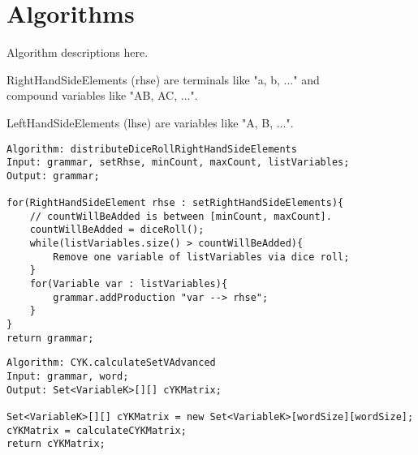 
\section{Algorithms}\label{algorithms}
Algorithm descriptions here.

\noindent RightHandSideElements (rhse) are terminals like "a, b, ..." and \\
compound variables like "AB, AC, ...".

\noindent LeftHandSideElements (lhse) are variables like "A, B, ...".

\lstset{language=java}
\begin{lstlisting}[frame=htrbl, caption={distributeDiceRollRightHandSideElements}, 
label={lst:distributeDiceRollRightHandSideElements}]
Algorithm: distributeDiceRollRightHandSideElements
Input: grammar, setRhse, minCount, maxCount, listVariables;
Output: grammar;

for(RightHandSideElement rhse : setRightHandSideElements){
	// countWillBeAdded is between [minCount, maxCount]. 
	countWillBeAdded = diceRoll();
	while(listVariables.size() > countWillBeAdded){
		Remove one variable of listVariables via dice roll;
	}
	for(Variable var : listVariables){
		grammar.addProduction "var --> rhse";
	}
}
return grammar;
\end{lstlisting}

\lstset{language=java}
\begin{lstlisting}[frame=htrbl, caption={CYK.calculateSetVAdvanced}, 
label={lst:CYK.calculateSetVAdvanced}]
Algorithm: CYK.calculateSetVAdvanced
Input: grammar, word;
Output: Set<VariableK>[][] cYKMatrix;

Set<VariableK>[][] cYKMatrix = new Set<VariableK>[wordSize][wordSize];
cYKMatrix = calculateCYKMatrix;
return cYKMatrix;
\end{lstlisting}

\pagebreak

